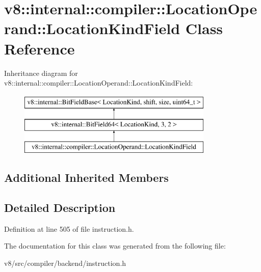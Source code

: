 \hypertarget{classv8_1_1internal_1_1compiler_1_1LocationOperand_1_1LocationKindField}{}\section{v8\+:\+:internal\+:\+:compiler\+:\+:Location\+Operand\+:\+:Location\+Kind\+Field Class Reference}
\label{classv8_1_1internal_1_1compiler_1_1LocationOperand_1_1LocationKindField}
Inheritance diagram for v8\+:\+:internal\+:\+:compiler\+:\+:Location\+Operand\+:\+:Location\+Kind\+Field\+:\begin{figure}[H]
\begin{center}
\leavevmode
\includegraphics[height=3.000000cm]{classv8_1_1internal_1_1compiler_1_1LocationOperand_1_1LocationKindField}
\end{center}
\end{figure}
\subsection*{Additional Inherited Members}


\subsection{Detailed Description}


Definition at line 505 of file instruction.\+h.



The documentation for this class was generated from the following file\+:\begin{DoxyCompactItemize}
\item 
v8/src/compiler/backend/instruction.\+h\end{DoxyCompactItemize}
